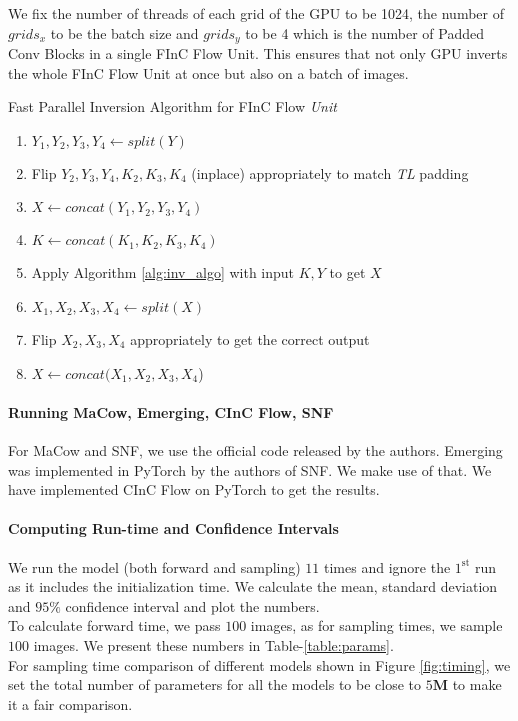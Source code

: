 \documentclass[a4paper,twoside]{article}
\theoremstyle{definition}
\begin{document}
\noindent
We fix the number of threads of each grid of the GPU to be 1024, the number of $grids_x$ to be the batch size and $grids_y$ to be 4 which is the number of Padded Conv Blocks in a single FInC Flow Unit. This ensures that not only GPU inverts the whole FInC Flow Unit at once but also on a batch of images. 

\begin{algorithm}[!h]
    \caption{Fast Parallel Inversion Algorithm for FInC Flow \emph{Unit}}
    \label{alg:finc_flow_inverse}
    \begin{enumerate}
        \item{$Y_1, Y_2, Y_3, Y_4 \gets split(Y)$ }
        \item{Flip $Y_2, Y_3, Y_4, K_2, K_3, K_4$ (inplace) appropriately to match \emph{TL} padding}
        \item{$X \gets concat(Y_1, Y_2, Y_3, Y_4)$}
        \item{$K \gets concat(K_1, K_2, K_3, K_4)$}
        \item{Apply Algorithm \ref{alg:inv_algo} with input $K, Y$  to get $X$}
        \item{$X_1, X_2, X_3, X_4 \gets split(X)$}
        \item{Flip $X_2, X_3, X_4$ appropriately to get the correct output }
        \item{$X \gets concat(X_1, X_2, X_3, X_4$)}
    \end{enumerate}
\end{algorithm}


\paragraph{Running MaCow, Emerging, CInC Flow, SNF}
For MaCow and SNF, we use the official code released by the authors. Emerging was implemented in PyTorch by the authors of SNF. We make use of that. We have implemented CInC Flow on PyTorch to get the results.

\paragraph{Computing Run-time and Confidence Intervals}
We run the model (both forward and sampling) $11$ times and ignore the $1^{\text{st}}$ run as it includes the initialization time. We calculate the mean, standard deviation and $95\%$ confidence interval and plot the numbers. 
\\
To calculate forward time, we pass $100$ images, as for sampling times, we sample $100$ images. We present these numbers in Table-\ref{table:params}.
\\
For sampling time comparison of different models shown in Figure \ref{fig:timing}, we set the total number of parameters for all the models to be close to $5\mathbf{M}$ to make it a fair comparison. 
\end{document}

